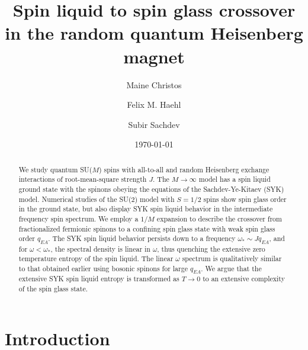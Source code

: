 \documentclass[aps,prx,preprint,onecolumn,citeautoscript,superscriptaddress,nofootinbib,
eqsecnum]{revtex4}
\begin{document}

\title{Spin liquid to spin glass crossover\\ in the random quantum Heisenberg magnet}

\author{Maine Christos}

\author{Felix M. Haehl}

\author{Subir Sachdev}

\date{\today}

\begin{abstract}
We study quantum SU($M$) spins with all-to-all and random Heisenberg exchange interactions of root-mean-square strength $J$.
The $M \rightarrow \infty$ model has a spin liquid ground state with the spinons obeying the equations of the Sachdev-Ye-Kitaev (SYK) model. Numerical studies of the SU(2) model with $S=1/2$ spins show spin glass order in the ground state, but also display SYK spin liquid behavior in the intermediate frequency spin spectrum. We employ a $1/M$ expansion to describe the crossover from fractionalized fermionic spinons
to a confining spin glass state with weak spin glass order $q_{EA}$.
The SYK spin liquid behavior persists down to a frequency $\omega_\ast \sim J q_{EA}$, and for $\omega < \omega_\ast$, the spectral density is linear in $\omega$, thus quenching the extensive zero temperature entropy of the spin liquid. The linear $\omega$ spectrum is qualitatively similar to that obtained earlier using bosonic spinons for large $q_{EA}$.
We argue that the extensive SYK spin liquid entropy is transformed as $T \rightarrow 0$ to an extensive complexity of the spin glass state.
\end{abstract}
\maketitle
\tableofcontents

\section{Introduction}
\label{sec:intro}
\end{document}
